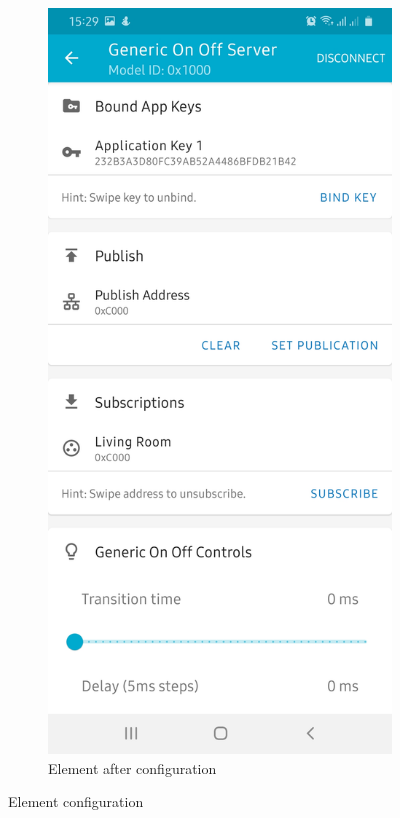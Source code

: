 \documentclass[\main/main.tex]{subfiles}
\begin{document}
\begin{figure}[H]
    \begin{subfigure}[b]{0.4\linewidth}
        \centering
        \includegraphics[width=0.9\linewidth]{nRF_Mesh_07.jpg}
        \caption{Element after configuration}
    \end{subfigure}
    \caption{Element configuration}
    \label{fig:element_configuration}
\end{figure}
\end{document}
